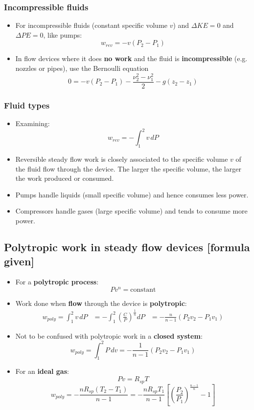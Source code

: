 \documentclass[11pt]{article}
\begin{document}
\subsubsection{Incompressible fluids}
\label{sec:org7b4468d}
\begin{itemize}
\item For incompressible fluids (constant specific volume \(v\)) and \(\Delta KE = 0\) and \(\Delta PE = 0\), like pumps:
\[w_{rev} = -v (P_2 - P_1)\]
\item In flow devices where it does \textbf{no work} and the fluid is \textbf{incompressible} (e.g. nozzles or pipes), use the Bernoulli equation
\[0 = -v (P_2 - P_1) - \frac{\nu_2^2 - \nu_1^2}{2} - g(z_2 - z_1)\]
\end{itemize}

\subsubsection{Fluid types}
\label{sec:orgb4afd03}
\begin{itemize}
\item Examining:
\[w_{rev} = - \int_1^2 v \, dP\]
\item Reversible steady flow work is closely associated to the specific volume \(v\) of the fluid flow through the device. The larger the specific volume, the larger the work produced or consumed.
\item Pumps handle liquids (small specific volume) and hence consumes less power.
\item Compressors handle gases (large specific volume) and tends to consume more power.
\end{itemize}

 \newpage

\subsection{Polytropic work in steady flow devices [formula given]}
\label{sec:org86bcf87}
\begin{itemize}
\item For a \textbf{polytropic process}:
\[Pv^n = \text{constant}\]
\item Work done when \textbf{flow} through the device is \textbf{polytropic}:
\begin{align*}
w_{poly} = \int_1^2 v \, dP &= - \int_1^2 \left(\frac{C}{P} \right)^{\frac{1}{n}} dP
&= - \frac{n}{n - 1}(P_2 v_2 - P_1 v_1)
\end{align*}
\item Not to be confused with polytropic work in a \textbf{closed system}:
\[w_{poly} = \int_1^2 P \, dv = - \frac{1}{n - 1} (P_2 v_2 - P_1 v_1)\]
\item For an \textbf{ideal gas}:
\[Pv = R_{sp} T\]
\[w_{poly} = - \frac{n R_{sp} (T_2 - T_1)}{n - 1} = - \frac{n R_{sp} T_1}{n - 1} \left[\left(\frac{P_2}{P_1} \right)^{\frac{n - 1}{n}} - 1 \right]\]
\end{itemize}
\end{document}
